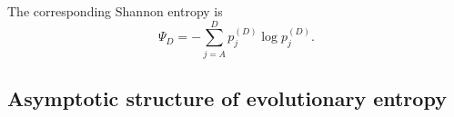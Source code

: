 \documentclass[10pt,a4paper]{amsart}
\theoremstyle{definition}
\theoremstyle{remark}
\numberwithin{equation}{section}
\begin{document}
%
%
%
%


The corresponding Shannon entropy
\cite{shannon1948,CoverThomas,Gray2011,Jaynes1957,Jaynes1957b}
is
\[
\Psi_D
=
-
\sum_{j=A}^{D}
p_j^{(D)}
\log p_j^{(D)}.
\]

%
%



\subsection{Asymptotic structure of evolutionary entropy}
\end{document}
